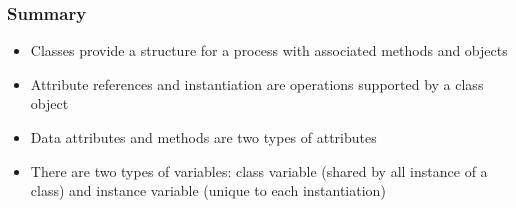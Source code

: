 \documentclass{beamer}
\begin{document}
\begin{frame}
\frametitle{Summary}

\begin{itemize}
\item Classes provide a structure for a process with associated methods and objects
\item Attribute references and instantiation are operations supported by a class object
\item Data attributes and methods are two types of attributes
\item There are two types of variables: class variable (shared by all instance of a class) and instance variable (unique to each instantiation)
\end{itemize}


\end{frame}
\end{document}
